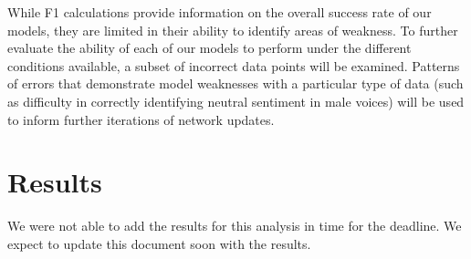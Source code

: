 While F1 calculations provide information on the overall success rate of our
models, they are limited in their ability to identify areas of weakness. To
further evaluate the ability of each of our models to perform under the different
conditions available, a subset of incorrect data points will be examined.
Patterns of errors that demonstrate model weaknesses with a particular type of
data (such as difficulty in correctly identifying neutral sentiment in male
voices) will be used to inform further iterations of network updates.

\section{Results}

We were not able to add the results for this analysis in time for the deadline.
We expect to update this document soon with the results.
